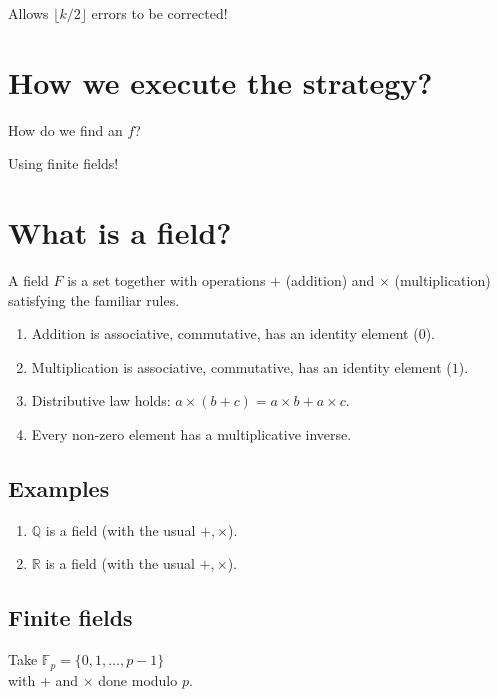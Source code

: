 \documentclass[11pt]{article}
\begin{document}
Allows \(\lfloor k/2 \rfloor\) errors to be corrected!

\begin{center}

\end{center}

\section*{How we execute the strategy?}
\label{sec:org65f95d1}

How do we find an \(f\)?

Using finite fields!

\section*{What is a field?}
\label{sec:orgcc53245}

A field \(F\) is a set together with operations \(+\) (addition) and \(\times\) (multiplication) satisfying the familiar rules.

\begin{enumerate}
\item Addition is associative, commutative, has an identity element (\(0\)).
\item Multiplication is associative, commutative, has an identity element (\(1\)).
\item Distributive law holds: \(a \times (b+c) = a \times b + a \times c\).
\item Every non-zero element has a multiplicative inverse.
\end{enumerate}

\subsection*{Examples}
\label{sec:orgfa0d09b}
\begin{enumerate}
\item \(\mathbb Q\) is a field (with the usual \(+, \times\)).
\item \(\mathbb R\) is a field (with the usual \(+, \times\)).
\end{enumerate}

\subsection*{Finite fields}
\label{sec:org47a59ac}
Take \(\mathbb F_p = \{0,1,\dots, p-1\}\)\\
with \(+\) and \(\times\) done modulo \(p\).
\end{document}
